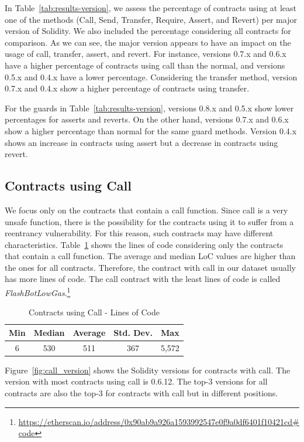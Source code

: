 \documentclass[10pt,conference]{IEEEtran}
\begin{document}
In Table~\ref{tab:results-version}, we assess the percentage of contracts using at least one of the methods (Call, Send, Transfer, Require, Assert, and Revert) per major version of Solidity. We also included the percentage considering all contracts for comparison.  As we can see, the major version appears to have an impact on the usage of call, transfer, assert, and revert. For instance, versions 0.7.x and 0.6.x have a higher percentage of contracts using call than the normal, and versions 0.5.x and 0.4.x have a lower percentage.  Considering the transfer method,  version 0.7.x and 0.4.x show a higher percentage of contracts using transfer.  

For the guards in Table~\ref{tab:results-version},  versions 0.8.x and 0.5.x show lower percentages for asserts and reverts.  On the other hand, versions 0.7.x and 0.6.x show a higher percentage than normal for the same guard methods. Version 0.4.x shows an increase in contracts using assert but a decrease in contracts using revert. 


\subsection{Contracts using Call}

We focus only on the contracts that contain a call function. Since call is a very unsafe function, there is the possibility for the contracts using it to suffer from a reentrancy vulnerability. For this reason, such contracts may have different characteristics. Table~\ref{tab:call-loc} shows the lines of code considering only the contracts that contain a call function. The average and median LoC values are higher than the ones for all contracts. Therefore, the contract with call in our dataset usually has more lines of code. The call contract with the least lines of code is called \textit{FlashBotLowGas}.\footnote{\url{https://etherscan.io/address/0x90ab9a926a1593992547e0f9a0df6401f10421cd\#code}}

\begin{table}[h]
\center
  \caption{Contracts using Call - Lines of Code}
  \label{tab:call-loc}
  \begin{tabular}{c c c c c}
    \hline
    Min & Median & Average & Std. Dev. & Max \\
    \hline
   6 & 530 & 511 & 367 & 5,572 \\
  \hline
\end{tabular}
\end{table}

Figure~\ref{fig:call_version} shows the Solidity versions for contracts with call. The version with most contracts using call is 0.6.12.  The top-3 versions for all contracts are also the top-3 for contracts with call but in different positions. 
\end{document}
